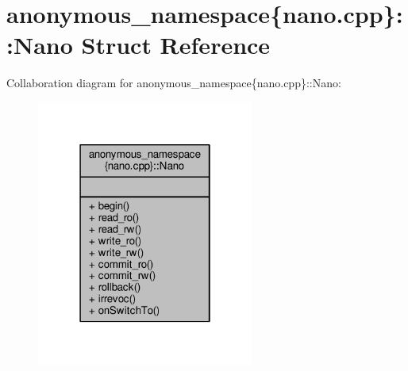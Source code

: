 \hypertarget{structanonymous__namespace_02nano_8cpp_03_1_1Nano}{\section{anonymous\-\_\-namespace\{nano.\-cpp\}\-:\-:Nano Struct Reference}
\label{structanonymous__namespace_02nano_8cpp_03_1_1Nano}
}


Collaboration diagram for anonymous\-\_\-namespace\{nano.\-cpp\}\-:\-:Nano\-:
\nopagebreak
\begin{figure}[H]
\begin{center}
\leavevmode
\includegraphics[width=202pt]{structanonymous__namespace_02nano_8cpp_03_1_1Nano__coll__graph}
\end{center}
\end{figure}
